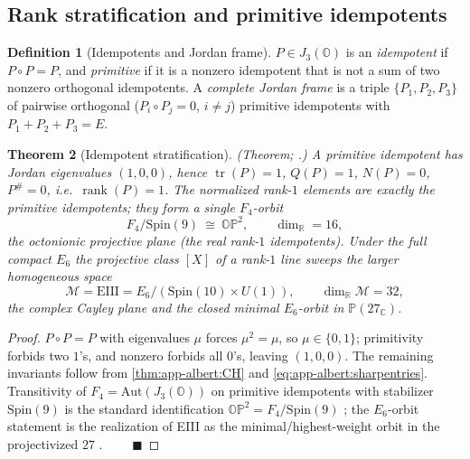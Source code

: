 \documentclass[11pt]{article}
\theoremstyle{plain}
\newtheorem{theorem}{Theorem}[section]
\theoremstyle{definition}
\newtheorem{definition}[theorem]{Definition}
\theoremstyle{remark}
\begin{document}
\subsection{Rank stratification and primitive idempotents}
\label{sec:app-albert:idempotents}

\begin{definition}[Idempotents and Jordan frame]\label{def:app-albert:idemp}
$P\in J_3(\mathbb O)$ is an \emph{idempotent} if $P\circ P=P$, and
\emph{primitive} if it is a nonzero idempotent that is not a sum of two nonzero
orthogonal idempotents. A \emph{complete Jordan frame} is a triple
$\{P_1,P_2,P_3\}$ of pairwise orthogonal ($P_i\circ P_j=0$, $i\neq j$) primitive
idempotents with $P_1+P_2+P_3=E$.
\end{definition}

\begin{theorem}[Idempotent stratification]\label{thm:app-albert:idemp}
\textup{(Theorem; \cite{McCrimmon:2004,Yokota:2009}.)}
A primitive idempotent has Jordan eigenvalues $(1,0,0)$, hence
$\operatorname{tr}(P)=1$, $Q(P)=1$, $N(P)=0$, $P^\#=0$, i.e.\
$\operatorname{rank}(P)=1$. The normalized rank-$1$ elements are exactly the
primitive idempotents; they form a single $F_4$-orbit
\begin{equation}\label{eq:app-albert:OP2}
  F_4/\mathrm{Spin}(9)\ \cong\ \mathbb{OP}^2,
  \qquad \dim_{\mathbb R}=16,
\end{equation}
the octonionic projective plane (the real rank-$1$ idempotents). Under the full
\emph{compact} $E_6$ the projective class $[X]$ of a rank-$1$ line sweeps the
larger homogeneous space
\begin{equation}\label{eq:app-albert:EIII}
  \mathcal M=\mathrm{EIII}=E_6/(\mathrm{Spin}(10)\times U(1)),
  \qquad \dim_{\mathbb R}\mathcal M=32,
\end{equation}
the complex Cayley plane and the closed minimal $E_6$-orbit in
$\mathbb P(27_{\mathbb C})$.
\end{theorem}

\begin{proof}
$P\circ P=P$ with eigenvalues $\mu$ forces $\mu^2=\mu$, so $\mu\in\{0,1\}$;
primitivity forbids two $1$'s, and nonzero forbids all $0$'s, leaving $(1,0,0)$.
The remaining invariants follow from \autoref{thm:app-albert:CH} and
\eqref{eq:app-albert:sharpentries}. Transitivity of $F_4=\mathrm{Aut}(J_3(\mathbb
O))$ on primitive idempotents with stabilizer $\mathrm{Spin}(9)$ is the standard
identification $\mathbb{OP}^2=F_4/\mathrm{Spin}(9)$
\cite{Baez:2002,Yokota:2009}; the $E_6$-orbit statement is the realization of
EIII as the minimal/highest-weight orbit in the projectivized $27$
\cite{Springer:2000}. $\qquad\blacksquare$
\end{proof}
\end{document}
